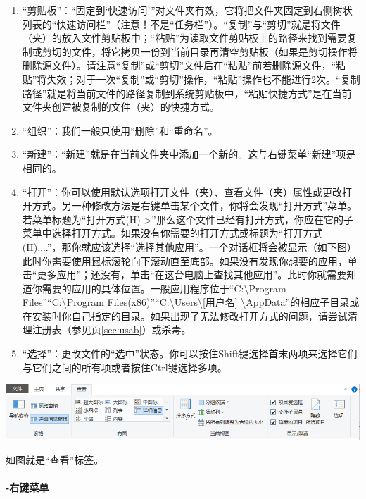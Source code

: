 \begin{enumerate}
	\item “剪贴板”：“固定到‘快速访问’”对文件夹有效，它将把文件夹固定到右侧树状列表的“快速访问栏”（注意！不是“任务栏”）。“复制”与“剪切”就是将文件（夹）的{\color{red}{路径}}放入文件剪贴板中；“粘贴”为读取文件剪贴板上的路径来找到需要复制或剪切的文件，将它拷贝一份到当前目录再清空剪贴板（如果是剪切操作将删除源文件）。请注意“复制”或“剪切”文件后在“粘贴”前若删除源文件，“粘贴”将失效；对于一次“复制”或“剪切”操作，“粘贴”操作也不能进行2次。“复制路径”就是将当前文件的路径复制到系统剪贴板中，“粘贴快捷方式”是在当前文件夹创建被复制的文件（夹）的快捷方式。
	\item “组织”：我们一般只使用“删除”和“重命名”。
	\item “新建”：“新建”就是在当前文件夹中添加一个新的。这与右键菜单“新建”项是相同的。
	\item “打开”：你可以使用默认选项打开文件（夹）、查看文件（夹）属性或更改打开方式。另一种修改方法是右键单击某个文件，你将会发现“打开方式”菜单。若菜单标题为“打开方式(H)    >”那么这个文件已经有打开方式，你应在它的子菜单中选择打开方式。如果没有你需要的打开方式或标题为“打开方式(H)....”，那你就应该选择“选择其他应用”。一个对话框将会被显示（如下图）此时你需要使用鼠标滚轮向下滚动直至底部。如果没有发现你想要的应用，单击“更多应用”；还没有，单击“在这台电脑上查找其他应用”。此时你就需要知道你需要的应用的具体位置。一般应用程序位于“C:\textbackslash Program Files”“C:\textbackslash Program Files(x86)”“C:\textbackslash Users\textbackslash [用户名] \textbackslash AppData”的相应子目录或在安装时你自己指定的目录。{\color{red}{为了避免这个问题，你需要在安装程序时记下安装位置。}}如果出现了无法修改打开方式的问题，请尝试清理注册表（参见\pageref{sec:usab}页\ref{sec:usab}）或杀毒。
	\item “选择”：更改文件的“选中”状态。你可以按住Shift键选择首末两项来选择它们与它们之间的所有项或者按住Ctrl键选择多项。
\end{enumerate}\par
\begin{center}
	\includegraphics[scale=0.8]{pic/Exp2}
\end{center} \par
如图就是“查看”标签。
\paragraph{-右键菜单}

